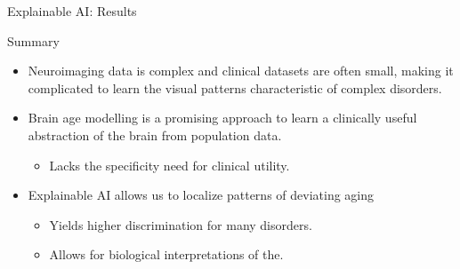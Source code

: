 \documentclass{beamer}
\begin{document}
    \newsavebox{\clinicalbaseline}

    \newsavebox{\clinicalbrainage}

    \newsavebox{\clinicalheatmaps}

    \begin{frame}{Explainable AI: Results}
        \vspace{-0.8cm}
        \hspace{-1.1cm}
    \end{frame}

    \begin{frame}{Summary}
        \begin{itemize}
            \item Neuroimaging data is complex and clinical datasets are often small, making it complicated to learn the visual patterns characteristic of complex disorders.
            \item Brain age modelling is a promising approach to learn a clinically useful abstraction of the brain from population data.
            \begin{itemize}
                \item Lacks the specificity need for clinical utility.
            \end{itemize}
            \item Explainable AI allows us to localize patterns of deviating aging
            \begin{itemize}
                \item Yields higher discrimination for many disorders.
                \item Allows for biological interpretations of the.
            \end{itemize}
        \end{itemize}
    \end{frame}
\end{document}
